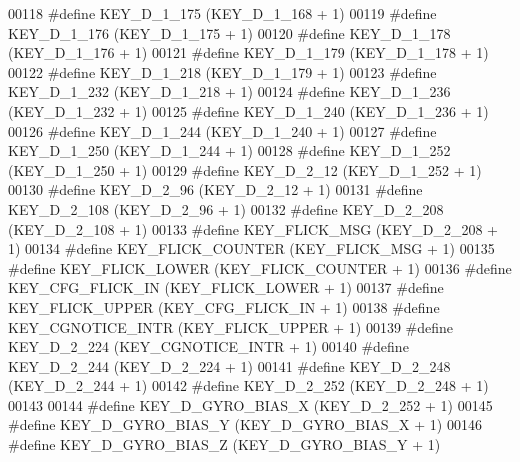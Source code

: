 \begin{DoxyCode}
00118 \textcolor{preprocessor}{#define KEY\_D\_1\_175                 (KEY\_D\_1\_168 + 1)}
00119 \textcolor{preprocessor}{#define KEY\_D\_1\_176                 (KEY\_D\_1\_175 + 1)}
00120 \textcolor{preprocessor}{#define KEY\_D\_1\_178                 (KEY\_D\_1\_176 + 1)}
00121 \textcolor{preprocessor}{#define KEY\_D\_1\_179                 (KEY\_D\_1\_178 + 1)}
00122 \textcolor{preprocessor}{#define KEY\_D\_1\_218                 (KEY\_D\_1\_179 + 1)}
00123 \textcolor{preprocessor}{#define KEY\_D\_1\_232                 (KEY\_D\_1\_218 + 1)}
00124 \textcolor{preprocessor}{#define KEY\_D\_1\_236                 (KEY\_D\_1\_232 + 1)}
00125 \textcolor{preprocessor}{#define KEY\_D\_1\_240                 (KEY\_D\_1\_236 + 1)}
00126 \textcolor{preprocessor}{#define KEY\_D\_1\_244                 (KEY\_D\_1\_240 + 1)}
00127 \textcolor{preprocessor}{#define KEY\_D\_1\_250                 (KEY\_D\_1\_244 + 1)}
00128 \textcolor{preprocessor}{#define KEY\_D\_1\_252                 (KEY\_D\_1\_250 + 1)}
00129 \textcolor{preprocessor}{#define KEY\_D\_2\_12                  (KEY\_D\_1\_252 + 1)}
00130 \textcolor{preprocessor}{#define KEY\_D\_2\_96                  (KEY\_D\_2\_12 + 1)}
00131 \textcolor{preprocessor}{#define KEY\_D\_2\_108                 (KEY\_D\_2\_96 + 1)}
00132 \textcolor{preprocessor}{#define KEY\_D\_2\_208                 (KEY\_D\_2\_108 + 1)}
00133 \textcolor{preprocessor}{#define KEY\_FLICK\_MSG               (KEY\_D\_2\_208 + 1)}
00134 \textcolor{preprocessor}{#define KEY\_FLICK\_COUNTER           (KEY\_FLICK\_MSG + 1)}
00135 \textcolor{preprocessor}{#define KEY\_FLICK\_LOWER             (KEY\_FLICK\_COUNTER + 1)}
00136 \textcolor{preprocessor}{#define KEY\_CFG\_FLICK\_IN            (KEY\_FLICK\_LOWER + 1)}
00137 \textcolor{preprocessor}{#define KEY\_FLICK\_UPPER             (KEY\_CFG\_FLICK\_IN + 1)}
00138 \textcolor{preprocessor}{#define KEY\_CGNOTICE\_INTR           (KEY\_FLICK\_UPPER + 1)}
00139 \textcolor{preprocessor}{#define KEY\_D\_2\_224                 (KEY\_CGNOTICE\_INTR + 1)}
00140 \textcolor{preprocessor}{#define KEY\_D\_2\_244                 (KEY\_D\_2\_224 + 1)}
00141 \textcolor{preprocessor}{#define KEY\_D\_2\_248                 (KEY\_D\_2\_244 + 1)}
00142 \textcolor{preprocessor}{#define KEY\_D\_2\_252                 (KEY\_D\_2\_248 + 1)}
00143 
00144 \textcolor{preprocessor}{#define KEY\_D\_GYRO\_BIAS\_X               (KEY\_D\_2\_252 + 1)}
00145 \textcolor{preprocessor}{#define KEY\_D\_GYRO\_BIAS\_Y               (KEY\_D\_GYRO\_BIAS\_X + 1)}
00146 \textcolor{preprocessor}{#define KEY\_D\_GYRO\_BIAS\_Z               (KEY\_D\_GYRO\_BIAS\_Y + 1)}

\end{DoxyCode}
